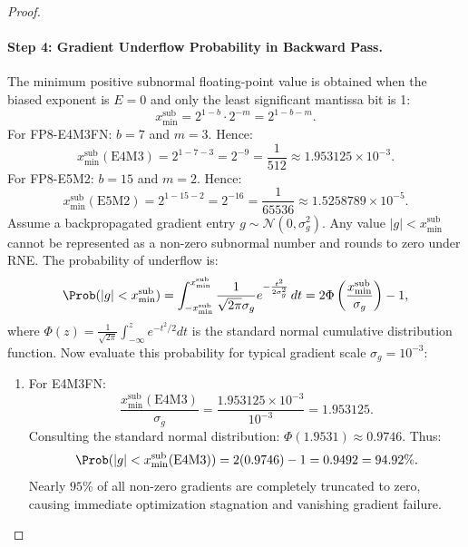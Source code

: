 \begin{proof}
\paragraph{Step 4: Gradient Underflow Probability in Backward Pass.}
The minimum positive subnormal floating-point value is obtained when the biased exponent is $E = 0$ and only the least significant mantissa bit is 1:
\begin{equation}
x_{\min}^{\text{sub}} = 2^{1 - b} \cdot 2^{-m} = 2^{1 - b - m}.
\end{equation}
For FP8-E4M3FN: $b = 7$ and $m = 3$. Hence:
\begin{equation}
x_{\min}^{\text{sub}}(\text{E4M3}) = 2^{1 - 7 - 3} = 2^{-9} = \frac{1}{512} \approx 1.953125 \times 10^{-3}.
\end{equation}
For FP8-E5M2: $b = 15$ and $m = 2$. Hence:
\begin{equation}
x_{\min}^{\text{sub}}(\text{E5M2}) = 2^{1 - 15 - 2} = 2^{-16} = \frac{1}{65536} \approx 1.5258789 \times 10^{-5}.
\end{equation}
Assume a backpropagated gradient entry $g \sim \mathcal{N}(0, \sigma_g^2)$.
Any value $|g| < x_{\min}^{\text{sub}}$ cannot be represented as a non-zero subnormal number and rounds to zero under RNE.
The probability of underflow is:
\begin{equation}
\Prob(|g| < x_{\min}^{\text{sub}}) = \int_{-x_{\min}^{\text{sub}}}^{x_{\min}^{\text{sub}}} \frac{1}{\sqrt{2\pi}\sigma_g} e^{-\frac{t^2}{2\sigma_g^2}} \, dt = 2 \Phi\left( \frac{x_{\min}^{\text{sub}}}{\sigma_g} \right) - 1,
\end{equation}
where $\Phi(z) = \frac{1}{\sqrt{2\pi}}\int_{-\infty}^z e^{-t^2/2} dt$ is the standard normal cumulative distribution function.
Now evaluate this probability for typical gradient scale $\sigma_g = 10^{-3}$:
\begin{enumerate}
    \item For E4M3FN:
    \begin{equation}
    \frac{x_{\min}^{\text{sub}}(\text{E4M3})}{\sigma_g} = \frac{1.953125 \times 10^{-3}}{10^{-3}} = 1.953125.
    \end{equation}
    Consulting the standard normal distribution: $\Phi(1.9531) \approx 0.9746$.
    Thus:
    \begin{equation}
    \Prob(|g| < x_{\min}^{\text{sub}}(\text{E4M3})) = 2(0.9746) - 1 = 0.9492 = 94.92\%.
    \end{equation}
    Nearly $95\%$ of all non-zero gradients are completely truncated to zero, causing immediate optimization stagnation and vanishing gradient failure.

\end{enumerate}
\end{proof}
